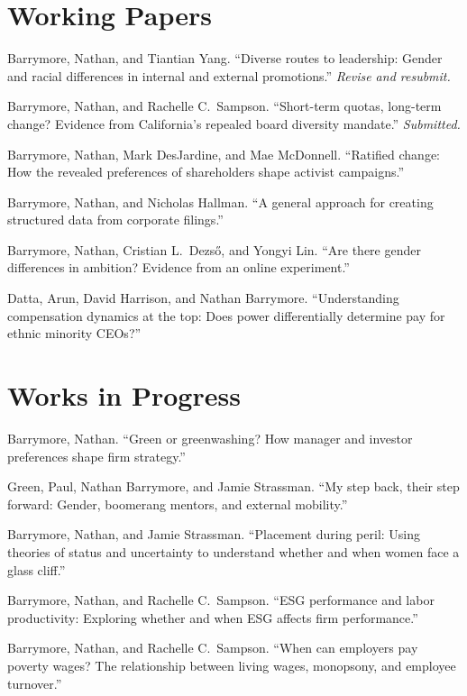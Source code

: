 \documentclass[11pt]{article}
\newcommand{\pub}[1]{#1\par\vspace{6pt}}
\begin{document}
\section*{Working Papers}

\pub{Barrymore, Nathan, and Tiantian Yang. ``Diverse routes to leadership: Gender and racial
differences in internal and external promotions.'' \textit{Revise and resubmit.}}

\pub{Barrymore, Nathan, and Rachelle C.\ Sampson. ``Short-term quotas, long-term change? Evidence
from California's repealed board diversity mandate.'' \textit{Submitted.}}

\pub{Barrymore, Nathan, Mark DesJardine, and Mae McDonnell. ``Ratified change: How the revealed
preferences of shareholders shape activist campaigns.''}

\pub{Barrymore, Nathan, and Nicholas Hallman. ``A general approach for creating structured data
from corporate filings.''}

\pub{Barrymore, Nathan, Cristian L.\ Dezső, and Yongyi Lin. ``Are there gender differences in
ambition? Evidence from an online experiment.''}

\pub{Datta, Arun, David Harrison, and Nathan Barrymore. ``Understanding compensation dynamics at the
top: Does power differentially determine pay for ethnic minority CEOs?''}

\section*{Works in Progress}

\pub{Barrymore, Nathan. ``Green or greenwashing? How manager and investor preferences shape firm
strategy.''}

\pub{Green, Paul, Nathan Barrymore, and Jamie Strassman. ``My step back, their step forward: Gender,
boomerang mentors, and external mobility.''}

\pub{Barrymore, Nathan, and Jamie Strassman. ``Placement during peril: Using theories of status and
uncertainty to understand whether and when women face a glass cliff.''}

\pub{Barrymore, Nathan, and Rachelle C.\ Sampson. ``ESG performance and labor productivity:
Exploring whether and when ESG affects firm performance.''}

\pub{Barrymore, Nathan, and Rachelle C.\ Sampson. ``When can employers pay poverty wages? The
relationship between living wages, monopsony, and employee turnover.''}
\end{document}
